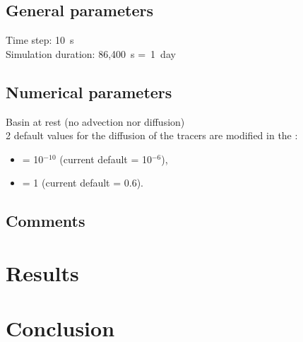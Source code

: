 \subsection{General parameters}
%
Time step: 10~s\\
Simulation duration: 86,400~s =~1~day
%
%
%
\subsection{Numerical parameters}
%
Basin at rest (no advection nor diffusion)\\

2 default values for the diffusion of the tracers are modified
in the   :
\begin{itemize}
\item {} = 10$^{-10}$ (current default = 10$^{-6}$),
\item {} = 1 (current default = 0.6).
\end{itemize}
%
\subsection{Comments}
%
%
%
\section{Results}
%

%
\section{Conclusion}
%

%
%
